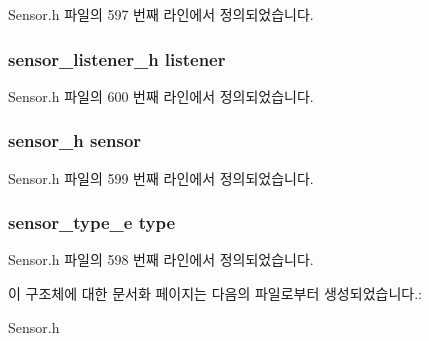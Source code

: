 Sensor.\-h 파일의 597 번째 라인에서 정의되었습니다.

\hypertarget{struct___humidity_extend_aa977dfb866b24fd7d9a20a9a01b2fd1f}{
\subsubsection[{listener}]{\setlength{\rightskip}{0pt plus 5cm}sensor\-\_\-listener\-\_\-h listener}}\label{struct___humidity_extend_aa977dfb866b24fd7d9a20a9a01b2fd1f}


Sensor.\-h 파일의 600 번째 라인에서 정의되었습니다.

\hypertarget{struct___humidity_extend_a5bae9b7801bc3808411925cde81d3f26}{
\subsubsection[{sensor}]{\setlength{\rightskip}{0pt plus 5cm}sensor\-\_\-h sensor}}\label{struct___humidity_extend_a5bae9b7801bc3808411925cde81d3f26}


Sensor.\-h 파일의 599 번째 라인에서 정의되었습니다.

\hypertarget{struct___humidity_extend_abffb09766da2fc510a79bb51f82a36e1}{
\subsubsection[{type}]{\setlength{\rightskip}{0pt plus 5cm}sensor\-\_\-type\-\_\-e type}}\label{struct___humidity_extend_abffb09766da2fc510a79bb51f82a36e1}


Sensor.\-h 파일의 598 번째 라인에서 정의되었습니다.



이 구조체에 대한 문서화 페이지는 다음의 파일로부터 생성되었습니다.\-:\begin{DoxyCompactItemize}
\item 
Sensor.\-h\end{DoxyCompactItemize}
